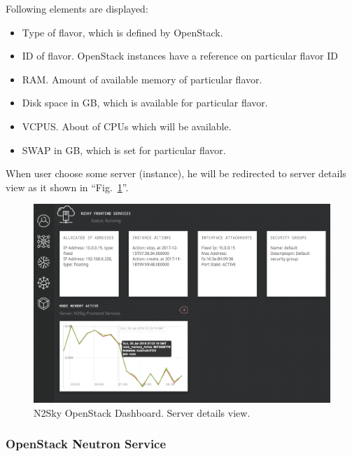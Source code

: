 \begin{description}
Following elements are displayed: 
\begin{itemize}
\item Type of flavor, which is defined by OpenStack.
\item ID of flavor. OpenStack instances have a reference on particular flavor ID
\item RAM. Amount of available memory of particular flavor. 
\item Disk space in GB, which is available for particular flavor. 
\item VCPUS. About of CPUs which will be available. 
\item SWAP in GB, which is set for particular flavor.
\end{itemize}

\end{description}

When user choose some server (instance), he will be redirected to server details view as it shown in ``Fig.~\ref{fig:openstack_server_details}''.

 \begin{figure}[htbp]
\begin{center}
  \includegraphics[width=\linewidth]{components/4/pics/openstack_server_details.png}
  \caption{N2Sky OpenStack Dashboard. Server details view.}
  \label{fig:openstack_server_details}
\end{center}
\end{figure}

\subsubsection{OpenStack Neutron Service}\label{OpenStack Neutron Service}

